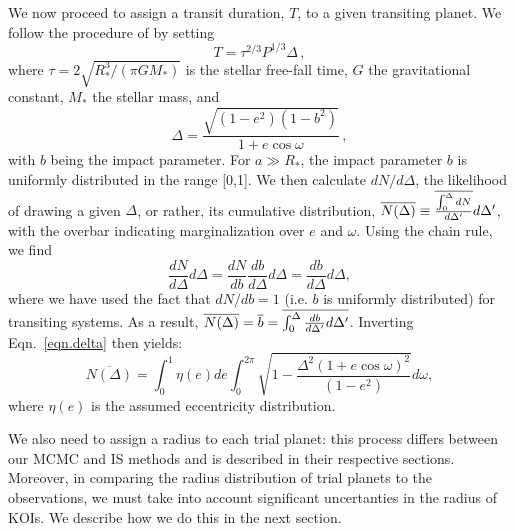 We now proceed to assign a transit duration, $T$, to a given
transiting planet. We follow the procedure of \citet{Gaidos2013} 
by setting
\begin{equation}
\label{eq:T_IS}
T = \tau^{2/3}P^{1/3}\Delta\, ,
\end{equation}
where $\tau = 2\sqrt{R_*^3/(\pi G M_*)}$ is the stellar free-fall
time, $G$ the gravitational constant, $M_*$ the stellar mass, and
\begin{equation}
\label{eqn.delta}
\Delta = \frac{\sqrt{(1-e^2)(1-b^2)}}{1 + e \cos \omega}\, , 
\end{equation}
with $b$ being the impact parameter. For $a \gg R_*$, the impact
parameter $b$ is uniformly distributed in the range [0,1].
We then calculate $dN/d\Delta$, the likelihood of drawing a
given $\Delta$, or rather, its cumulative distribution,
$\overline{N(\Delta)} \equiv \overline{\int_0^\Delta
{dN}\over{d\Delta'}}d\Delta'$, with the overbar indicating 
marginalization over $e$ and $\omega$. 
Using the chain rule, we find
\begin{equation}
\label{eq:delta1}
{\frac{dN}{d\Delta}} d\Delta = 
{\frac{dN}{db}}
{\frac{db}{d\Delta}} d\Delta = 
{\frac{db}{d\Delta}} d\Delta,
\end{equation}
where we have used the fact that $dN/db = 1$ (i.e. $b$ is uniformly distributed) 
for transiting systems.
As a result, $\overline{N(\Delta)} = \overline{b} = \overline{\int_0^\Delta
  {{db}\over{d\Delta'}} d\Delta'}$.  Inverting
Eqn.~\ref{eqn.delta} then yields:
\begin{equation}
\overline{N(\Delta)} = \int_0^1 \eta(e) de \int_0^{2\pi} \sqrt{1 -
  \frac{\Delta^2\left(1 + e \cos \omega\right)^2}{\left(1-e^2\right)}}d\omega, 
\end{equation}
where $\eta(e)$ is the assumed eccentricity distribution.  

We also need to assign a radius to each trial planet: this
process differs between our MCMC and IS methods and is described in
their respective sections. Moreover, in comparing the radius
distribution of trial planets to the observations, we must take into
account significant uncertanties in the radius of KOIs.
We describe how we do this in the next section.

